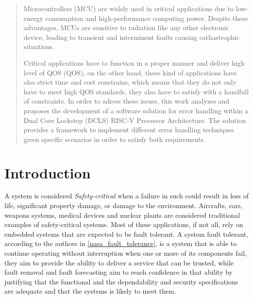 \documentclass[10pt, a4paper]{report}
\begin{document}
\newpage

\begin{abstract}
    \thispagestyle{fancy}
    Microcontrollers (\acrshort{MCU}) are widely used in critical applications 
    due to low-energy consumption and high-performance computing power. Despite 
    these advantages, \acrshort{MCU}s are sensitive to radiation like any other
    electronic device, leading to transient and interminent faults causing
    cathastrophic situations.

    Critical applications have to function in a proper manner and deliver high
    level of \acrlong{QOS} (\acrshort{QOS}), on the other hand, these kind of
    applications have also strict time and cost constrains, which means that
    they do not only have to meet high \acrshort{QOS} standards, they also have
    to satisfy with a handfull of constraints. In order to adress these issues, 
    this work analyzes and proposes the development of a software solution for 
    error handling within a Dual Core Lockstep (\acrshort{DCLS}) RISC-V 
    Processor Architecture. The solution provides a framework to implement 
    different error handling techniques given specific scenarios in order to 
    satisfy both requirements.
\end{abstract}

\newpage
\begin{tableofcontents}
    \thispagestyle{fancy}
\end{tableofcontents}

\newpage

\chapter{Introduction}

\thispagestyle{fancy}
A system is considered \emph{Safety-critical} when a failure in such could
result in loss of life, significant property damage, or damage to the
environment. Aircrafts, cars, weapons systems, medical devices and nuclear 
plants are considered traditional examples of safety-critical systems. Most of 
these applications, if not all, rely on embedded systems that are expected to be 
fault tolerant. A system fault tolerant, according to the authors in 
\ref{nasa_fault_tolerance}, is a system that is able to continue operating 
without interruption when one or more of its components fail, they aim 
to provide the ability to deliver a service that can be trusted, while fault 
removal and fault forecasting aim to reach confidence in that ability by 
justifying that the functional and the dependability and security specifications 
are adequate and that the systems is likely to meet them.
\end{document}
